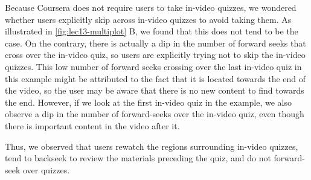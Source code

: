 \documentclass{sigchi}
\begin{document}
Because Coursera does not require users to take in-video quizzes, we wondered whether users explicitly skip across in-video quizzes to avoid taking them. As illustrated in \autoref{fig:lec13-multiplot} B, we found that this does not tend to be the case. On the contrary, there is actually a dip in the number of forward seeks that cross over the in-video quiz, so users are explicitly trying not to skip the in-video quizzes. This low number of forward seeks crossing over the last in-video quiz in this example might be attributed to the fact that it is located towards the end of the video, so the user may be aware that there is no new content to find towards the end. However, if we look at the first in-video quiz in the example, we also observe a dip in the number of forward-seeks over the in-video quiz, even though there is important content in the video after it.

Thus, we observed that users rewatch the regions surrounding in-video quizzes, tend to backseek to review the materials preceding the quiz, and do not forward-seek over quizzes.



\end{document}
